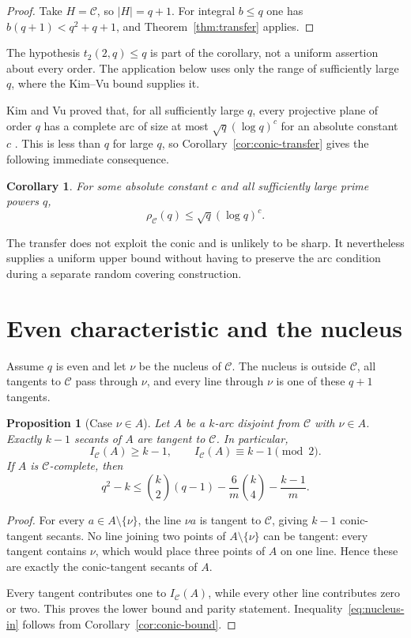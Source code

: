 \documentclass[11pt]{article}
\newtheorem{proposition}[theorem]{Proposition}
\newtheorem{corollary}[theorem]{Corollary}
\theoremstyle{definition}
\theoremstyle{remark}
\newcommand{\cC}{\mathcal{C}}
\newcommand{\IC}{I_{\cC}}
\newcommand{\rhoC}{\rho_{\cC}}
\begin{document}
\begin{proof}
Take $H=\cC$, so $|H|=q+1$.  For integral $b\le q$ one has
$b(q+1)<q^2+q+1$, and Theorem~\ref{thm:transfer} applies.
\end{proof}

The hypothesis \(t_2(2,q)\le q\) is part of the corollary, not a
uniform assertion about every order.  The application below uses only the
range of sufficiently large \(q\), where the Kim--Vu bound supplies it.

Kim and Vu proved that, for all sufficiently large $q$, every projective
plane of order $q$ has a complete arc of size at most
$\sqrt q(\log q)^c$ for an absolute constant $c$
\cite[Theorem~1.1]{KimVu2003}.  This is
less than $q$ for large $q$, so Corollary~\ref{cor:conic-transfer} gives the
following immediate consequence.

\begin{corollary}\label{cor:kim-vu}
For some absolute constant $c$ and all sufficiently large prime powers $q$,
\[
 \rhoC(q)\le\sqrt q(\log q)^c.
\]
\end{corollary}

The transfer does not exploit the conic and is unlikely to be sharp.  It
nevertheless supplies a uniform upper bound without having to preserve the
arc condition during a separate random covering construction.

\section{Even characteristic and the nucleus}
\label{sec:nucleus}

Assume $q$ is even and let $\nu$ be the nucleus of $\cC$.  The nucleus is
outside $\cC$, all tangents to $\cC$ pass through $\nu$, and every line
through $\nu$ is one of these $q+1$ tangents.

\begin{proposition}[Case $\nu\in A$]
\label{prop:nucleus-in}
Let $A$ be a $k$-arc disjoint from $\cC$ with $\nu\in A$.  Exactly $k-1$
secants of $A$ are tangent to $\cC$.  In particular,
\[
 \IC(A)\ge k-1,
 \qquad
 \IC(A)\equiv k-1\pmod2.
\]
If $A$ is $\cC$-complete, then
\begin{equation}
 q^2-k\le
 \binom{k}{2}(q-1)-\frac6m\binom{k}{4}-\frac{k-1}{m}.
\label{eq:nucleus-in}
\end{equation}
\end{proposition}

\begin{proof}
For every $a\in A\setminus\{\nu\}$, the line $\nu a$ is tangent to
$\cC$, giving $k-1$ conic-tangent secants.  No line joining two points of
$A\setminus\{\nu\}$ can be tangent: every tangent contains $\nu$, which
would place three points of $A$ on one line.  Hence these are exactly the
conic-tangent secants of $A$.

Every tangent contributes one to $\IC(A)$, while every other line
contributes zero or two.  This proves the lower bound and parity statement.
Inequality~\eqref{eq:nucleus-in} follows from
Corollary~\ref{cor:conic-bound}.
\end{proof}
\end{document}
